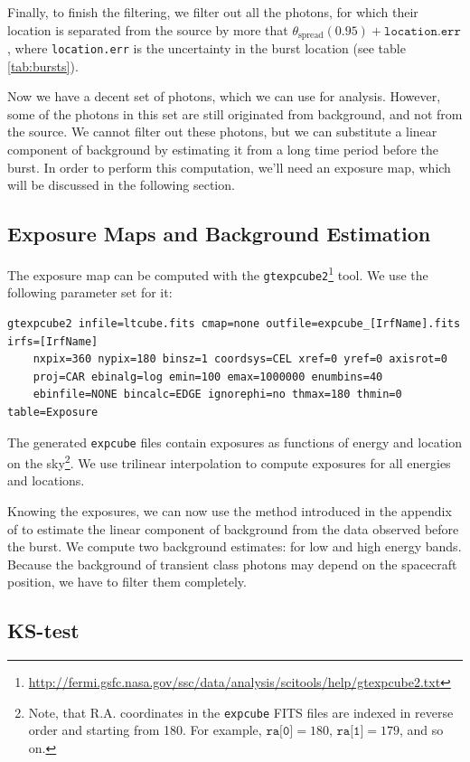 \documentclass{article}
\begin{document}
Finally, to finish the filtering, we filter out all the photons, for which their location is separated from the source by more that $\theta_{\text{spread}}\left(0.95\right) + \texttt{location.err}$, where \texttt{location.err} is the uncertainty in the burst location (see table \ref{tab:bursts}).

Now we have a decent set of photons, which we can use for analysis. However, some of the photons in this set are still originated from background, and not from the source. We cannot filter out these photons, but we can substitute a linear component of background by estimating it from a long time period before the burst. In order to perform this computation, we'll need an exposure map, which will be discussed in the following section.

\subsection{Exposure Maps and Background Estimation}

The exposure map can be computed with the \texttt{gtexpcube2}\footnote{\url{http://fermi.gsfc.nasa.gov/ssc/data/analysis/scitools/help/gtexpcube2.txt}} tool. We use the following parameter set for it:
\begin{lstlisting}
gtexpcube2 infile=ltcube.fits cmap=none outfile=expcube_[IrfName].fits irfs=[IrfName]
	nxpix=360 nypix=180 binsz=1 coordsys=CEL xref=0 yref=0 axisrot=0
	proj=CAR ebinalg=log emin=100 emax=1000000 enumbins=40
	ebinfile=NONE bincalc=EDGE ignorephi=no thmax=180 thmin=0 table=Exposure
\end{lstlisting}
The generated \texttt{expcube} files contain exposures as functions of energy and location on the sky\footnote{Note, that R.A. coordinates in the \texttt{expcube} FITS files are indexed in reverse order and starting from 180. For example, $\texttt{ra[0]}=180$, $\texttt{ra[1]}=179$, and so on.}. We use trilinear interpolation to compute exposures for all energies and locations.

Knowing the exposures, we can now use the method introduced in the appendix of \cite{Rubtsov:2011qq} to estimate the linear component of background from the data observed before the burst. We compute two background estimates: for low and high energy bands. Because the background of transient class photons may depend on the spacecraft position, we have to filter them completely.

\subsection{KS-test}
\end{document}
